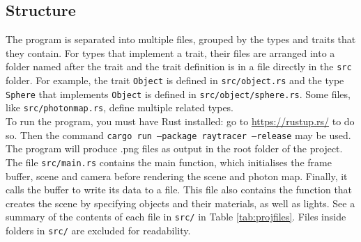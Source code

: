 \documentclass[a4paper]{article}
\begin{document}
\subsection{Structure}
The program is separated into multiple files, grouped by the types and traits that they contain. For types that implement a trait, their files are arranged into a folder named after the trait and the trait definition is in a file directly in the \texttt{src} folder. For example, the trait \texttt{Object} is defined in \texttt{src/object.rs} and the type \texttt{Sphere} that implements \texttt{Object} is defined in \texttt{src/object/sphere.rs}. Some files, like \texttt{src/photonmap.rs}, define multiple related types.\\

To run the program, you must have Rust installed: go to \url{https://rustup.rs/} to do so. Then the command \texttt{cargo run --package raytracer --release} may be used. The program will produce .png files as output in the root folder of the project.\\

The file \texttt{src/main.rs} contains the main function, which initialises the frame buffer, scene and camera before rendering the scene and photon map. Finally, it calls the buffer to write its data to a file. This file also contains the function that creates the scene by specifying objects and their materials, as well as lights. See a summary of the contents of each file in \texttt{src/} in Table \ref{tab:projfiles}. Files inside folders in \texttt{src/} are excluded for readability.\\
\end{document}
